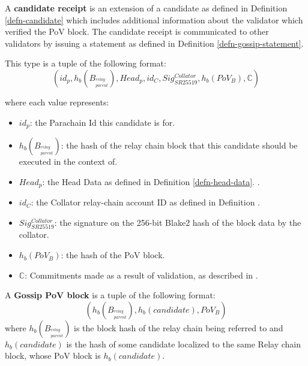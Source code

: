 \begin{definition}
  \label{defn-candidate-receipt}
  A \textbf{candidate receipt} is an extension of a candidate as defined in Definition \ref{defn-candidate}
  which includes additional information about the validator which verified the PoV block.
  The candidate receipt is communicated to other validators by issuing a statement as defined in Definition \ref{defn-gossip-statement}.
  \newline

  This type is a tuple of the following format:
  \[
  (id_p, h_b({B_{^{relay}_{parent}}}), Head_p, id_{C}, Sig^{Collator}_{SR25519}, h_b({PoV_B}), \mathbb{C})
  \]

  where each value represents:
  \begin{itemize}
    \item $id_p$: the Parachain Id this candidate is for.
    \item $h_b({B_{^{relay}_{parent}}})$: the hash of the relay chain block that this
    candidate should be executed in the context of.
    \item $Head_p$: the Head Data as defined in Definition \ref{defn-head-data}.
    .
    \item $id_C$: the Collator relay-chain account ID as defined in Definition
    .
    \item $Sig^{Collator}_{SR25519}$: the signature on the 256-bit Blake2 hash
    of the block data by the collator.
    \item $h_b({PoV_B})$: the hash of the PoV block.
    \item $\mathbb{C}$: Commitments made as a result of validation, as described in
    .
  \end{itemize}
\end{definition}

\begin{definition}
  \label{defn-pov-block}
  A \textbf{Gossip PoV block} is a tuple of the following format:
  \[
  (h_b(B_{^{relay}_{parent}}), h_b(candidate), PoV_B)
  \]
  where $h_b(B_{^{relay}_{parent}})$ is the block hash of the relay chain being
  referred to and $h_b(candidate)$ is the hash of some candidate localized to
  the same Relay chain block, whose PoV block is $h_b(candidate)$.
\end{definition}

